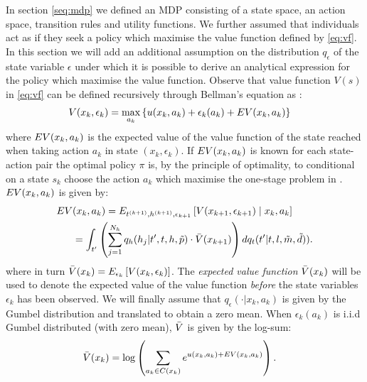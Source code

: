 In section \ref{seq:mdp} we defined an MDP consisting of a state space, an action space, transition rules and utility functions. We further assumed that individuals act as if they seek a policy which maximise the value function defined by \eqref{eq:vf}. In this section we will add an additional assumption on the distribution $q_\epsilon$ of the state variable $\epsilon$ under which it is possible to derive an analytical expression for the policy which maximise the value function. Observe that value function $V(s)$ in \eqref{eq:vf} can be defined recursively through Bellman's equation as \citep{bellman,Rust87}:
\begin{equation} \label{eq:vfbellman}
\begin{aligned}
V(x_k,\epsilon_k) &= \max_{a_k} \left\{\avgu(x_k,a_k) + \epsilon_k(a_k)+ \eutil(x_k,a_k) \right\} 
\end{aligned}
\end{equation}
where $EV(x_k,a_k) $ is the expected value of the value function of the state reached when taking action $a_k$ in state $(x_k,\epsilon_k)$. If $EV(x_k,a_k)$ is known for each state-action pair the optimal policy $\pi$ is, by the principle of optimality, to conditional on a state $s_k$ choose the action $a_k$ which maximise the one-stage problem in . $EV(x_k,a_k) $ is given by: 
\begin{equation} \label{eq:eutil}
\begin{aligned}
	\eutil&(x_k,a_k)  = E_{t\ks{k+1},\amem\ks{k+1},\epsilon_{k+1}}\left[ V(x_{k+1},\epsilon_{k+1}) \mid x_k,a_k \right] \\
	&= \int_{t'} \left( \sum_{j=1}^{N_{\amem}}q_\amem(\amem_j|t', t,\amem,\act{p}) \cdot \ev(x_{k+1}) \right)dq_t(t'|t,l,\act{m},\act{d})).
	\end{aligned}
\end{equation}
where in turn $\bar{V}(x_k) = E_{\epsilon_k} \left[ V(x_k,\epsilon_k) \right]$.
The \emph{expected value function} $\bar{V}(x_k)$ will be used to denote the expected value of the value function \emph{before} the state variables $\epsilon_k$ has been observed.  We will finally assume that $q_\epsilon(\cdot|x_k,a_k)$ is given by the Gumbel distribution and translated to obtain a zero mean. When $\epsilon_k(a_k)$ is i.i.d Gumbel distributed (with zero mean), $\bar{V}$ is given by the log-sum:
\begin{equation} \label{eq:evfbellman}
\begin{aligned}
\ev(x_k) &= %
\log\left(\sum_{a_k\in C(x_{k})} e^{\avgu(x_k,a_k) + \eutil(x_k,a_k)}\right).
\end{aligned}
\end{equation}
